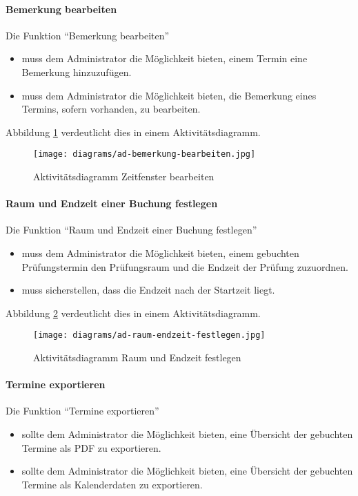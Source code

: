 \paragraph{Bemerkung bearbeiten}

Die Funktion ``Bemerkung bearbeiten''
\begin{itemize}
  \item muss dem Administrator die Möglichkeit bieten, einem Termin eine Bemerkung hinzuzufügen.
  \item muss dem Administrator die Möglichkeit bieten, die Bemerkung eines Termins, sofern vorhanden, zu bearbeiten.
\end{itemize}

Abbildung \ref{fig:ad-bemerkung-bearbeiten} verdeutlicht dies in einem Aktivitätsdiagramm.

\begin{figure}
  \centering
  \texttt{[image: diagrams/ad-bemerkung-bearbeiten.jpg]}
  \caption{Aktivitätsdiagramm Zeitfenster bearbeiten}
  \label{fig:ad-bemerkung-bearbeiten}
\end{figure}

\paragraph{Raum und Endzeit einer Buchung
festlegen}
Die Funktion ``Raum und Endzeit einer Buchung festlegen''
\begin{itemize}
  \item muss dem Administrator die Möglichkeit bieten, einem gebuchten Prüfungstermin den Prüfungsraum und die Endzeit der Prüfung zuzuordnen.
  \item muss sicherstellen, dass die Endzeit nach der Startzeit liegt.
\end{itemize}

Abbildung \ref{fig:ad-raum-endzeit-festlegen} verdeutlicht dies in einem Aktivitätsdiagramm.

\begin{figure}
  \centering
  \texttt{[image: diagrams/ad-raum-endzeit-festlegen.jpg]}
  \caption{Aktivitätsdiagramm Raum und Endzeit festlegen}
  \label{fig:ad-raum-endzeit-festlegen}
\end{figure}

\paragraph{Termine exportieren}

Die Funktion ``Termine exportieren''
\begin{itemize}
  \item sollte dem Administrator die Möglichkeit bieten, eine Übersicht der gebuchten Termine als PDF zu exportieren.
  \item sollte dem Administrator die Möglichkeit bieten, eine Übersicht der gebuchten Termine als Kalenderdaten zu exportieren.
\end{itemize}

